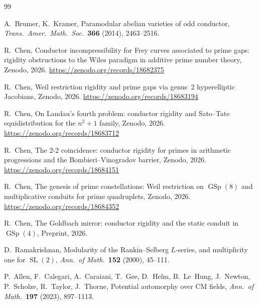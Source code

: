 \documentclass[11pt,a4paper]{article}
\theoremstyle{definition}
\DeclareMathOperator{\SL}{SL}
\DeclareMathOperator{\GSp}{GSp}
\begin{document}
\begin{thebibliography}{99}

A.~Brumer, K.~Kramer,
Paramodular abelian varieties of odd conductor,
\textit{Trans.\ Amer.\ Math.\ Soc.}\ \textbf{366} (2014), 2463--2516.

R.~Chen,
Conductor incompressibility for Frey curves associated to prime gaps: rigidity obstructions to the Wiles paradigm in additive prime number theory,
Zenodo, 2026.
\url{https://zenodo.org/records/18682375}

R.~Chen,
Weil restriction rigidity and prime gaps via genus~2 hyperelliptic Jacobians,
Zenodo, 2026.
\url{https://zenodo.org/records/18683194}

R.~Chen,
On Landau's fourth problem: conductor rigidity and Sato--Tate equidistribution for the $n^2+1$ family,
Zenodo, 2026.
\url{https://zenodo.org/records/18683712}

R.~Chen,
The 2-2 coincidence: conductor rigidity for primes in arithmetic progressions and the Bombieri--Vinogradov barrier,
Zenodo, 2026.
\url{https://zenodo.org/records/18684151}

R.~Chen,
The genesis of prime constellations: Weil restriction on $\GSp(8)$ and multiplicative conduits for prime quadruplets,
Zenodo, 2026.
\url{https://zenodo.org/records/18684352}

R.~Chen,
The Goldbach mirror: conductor rigidity and the static conduit in $\GSp(4)$,
Preprint, 2026.

D.~Ramakrishnan,
Modularity of the Rankin--Selberg $L$-series, and multiplicity one for $\SL(2)$,
\textit{Ann.\ of Math.}\ \textbf{152} (2000), 45--111.

P.~Allen, F.~Calegari, A.~Caraiani, T.~Gee, D.~Helm, B.~Le~Hung, J.~Newton, P.~Scholze, R.~Taylor, J.~Thorne,
Potential automorphy over CM fields,
\textit{Ann.\ of Math.}\ \textbf{197} (2023), 897--1113.

\end{thebibliography}
\end{document}
